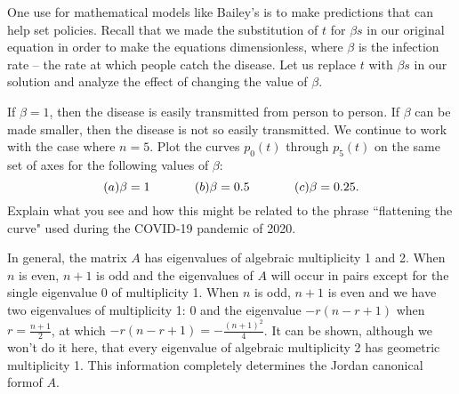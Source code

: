 One use for mathematical models like Bailey's is to make predictions that can help set policies. Recall that we made the substitution of $t$ for $\beta s$ in our original equation in order to make the equations dimensionless, where $\beta$ is the infection rate -- the rate at which people catch the disease. Let us replace $t$ with $\beta s$ in our solution and analyze the effect of changing the value of $\beta$.   

\begin{pactivity} If $\beta = 1$, then the disease is easily transmitted from person to person. If $\beta$ can be made smaller, then the disease is not so easily transmitted. 
We continue to work with the case where $n=5$. Plot the curves $p_0(t)$ through $p_5(t)$ on the same set of axes for the following values of $\beta$:
\[(a) \beta =1 \hspace{0.5in} (b) \beta = 0.5 \hspace{0.5in} (c) \beta = 0.25.\]
Explain what you see and how this might be related to the phrase ``flattening the curve" used during the COVID-19 pandemic of 2020. 

\end{pactivity}

In general, the matrix $A$ has eigenvalues of algebraic multiplicity 1 and 2. When $n$ is even, $n+1$ is odd and the eigenvalues of $A$ will occur in pairs except for the single eigenvalue $0$ of multiplicity 1. When $n$ is odd, $n+1$ is even and we have two eigenvalues of multiplicity 1: $0$ and the eigenvalue $-r(n-r+1)$ when $r = \frac{n+1}{2}$, at which $-r(n-r+1) = -\frac{(n+1)^2}{4}$. It can be shown, although we won't do it here, that every eigenvalue of algebraic multiplicity 2 has geometric multiplicity 1. This information completely determines the Jordan canonical formof $A$. 

